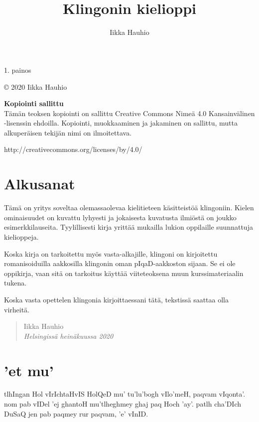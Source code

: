 \documentclass{book}
\title{{\pIqaD   }\\Klingonin kielioppi}
\author{Iikka Hauhio}
\begin{document}
\frontmatter

\maketitle

\newpage
\vspace*{\fill}
1. painos

© 2020 Iikka Hauhio


\textbf{Kopiointi sallittu} \\
Tämän teoksen kopiointi on sallittu Creative Commons Nimeä 4.0 Kansainvälinen -lisenssin ehdoilla.
Kopiointi, muokkaaminen ja jakaminen on sallittu, mutta alkuperäisen tekijän nimi on ilmoitettava.

http://creativecommons.org/licenses/by/4.0/

\chapter{Alkusanat}

Tämä on yritys soveltaa olemassaolevaa kielitieteen käsitteistöä klingoniin.
Kielen ominaisuudet on kuvattu lyhyesti ja jokaisesta kuvatusta ilmiöstä on joukko esimerkkilauseita.
Tyylillisesti kirja yrittää mukailla lukion oppilaille suunnattuja kielioppeja.

Koska kirja on tarkoitettu myös vasta-alkajille, klingoni on kirjoitettu romanisoiduilla aakkosilla klingonin oman pIqaD-aakkoston sijaan.
Se ei ole oppikirja, vaan sitä on tarkoitus käyttää viiteteoksena muun kurssimateriaalin tukena.

Koska vasta opettelen klingonia kirjoittaessani tätä, tekstissä saattaa olla virheitä.

\begin{quote}
    Iikka Hauhio \\
    \textit{Helsingissä heinäkuussa 2020}
\end{quote}

\chapter{'et mu'}

tlhIngan Hol vIrIchtaHvIS HolQeD mu' tu'lu'bogh vIlo'meH, paqvam vIqonta'.
nom pab vIDel 'ej ghantoH mu'tlheghmey ghaj paq Hoch 'ay'.
patlh cha'DIch DuSaQ jen pab paqmey rur paqvam, 'e' vInID.
\end{document}
